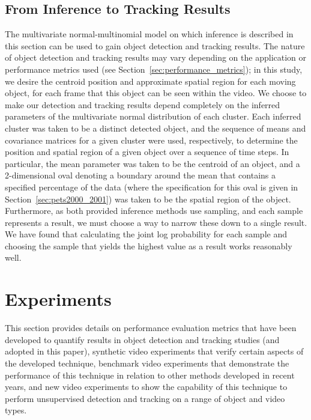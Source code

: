 \documentclass[smallcondensed, final]{svjour3}
\begin{document}


\subsection{From Inference to Tracking Results}
\label{sec:inference_to_results}
The multivariate normal-multinomial model on which inference is described in this section can be used to gain object detection and tracking results. The nature of object detection and tracking results may vary depending on the application or performance metrics used (see Section~\ref{sec:performance_metrics}); in this study, we desire the centroid position and approximate spatial region for each moving object, for each frame that this object can be seen within the video. We choose to make our detection and tracking results depend completely on the inferred parameters of the multivariate normal distribution of each cluster. Each inferred cluster was taken to be a distinct detected object, and the sequence of means and covariance matrices for a given cluster were used, respectively, to determine the position and spatial region of a given object over a sequence of time steps. In particular, the mean parameter was taken to be the centroid of an object, and a 2-dimensional oval denoting a boundary around the mean that contains a specified percentage of the data (where the specification for this oval is given in Section~\ref{sec:pets2000_2001}) was taken to be the spatial region of the object. Furthermore, as both provided inference methods use sampling, and each sample represents a result, we must choose a way to narrow these down to a single result. We have found that calculating the joint log probability for each sample and choosing the sample that yields the highest value as a result works reasonably well.







\section{Experiments}
\label{sec:experiments}

This section provides details on performance evaluation metrics that have been developed to quantify results in object detection and tracking studies (and adopted in this paper), synthetic video experiments that verify certain aspects of the developed technique, benchmark video experiments that demonstrate the performance of this technique in relation to other methods developed in recent years, and new video experiments to show the capability of this technique to perform unsupervised detection and tracking on a range of object and video types.   
\end{document}

